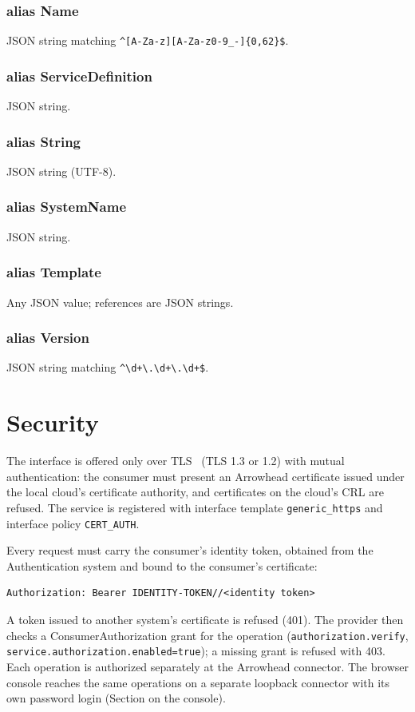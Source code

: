 \documentclass[a4paper]{arrowhead}
\newcommand{\pdef}[1]{{\textcolor{ArrowheadGrey}{#1\label{sec:model:primitives:#1}\label{sec:model:primitives:#1s}}}}
\begin{document}
\subsubsection*{alias \pdef{Name}}
JSON string matching \texttt{\^{}[A-Za-z][A-Za-z0-9\_-]\{0,62\}\$}.

\subsubsection*{alias \pdef{ServiceDefinition}}
JSON string.

\subsubsection*{alias \pdef{String}}
JSON string (UTF-8).

\subsubsection*{alias \pdef{SystemName}}
JSON string.

\subsubsection*{alias \pdef{Template}}
Any JSON value; references are JSON strings.

\subsubsection*{alias \pdef{Version}}
JSON string matching \texttt{\^{}\textbackslash{}d+\textbackslash{}.\textbackslash{}d+\textbackslash{}.\textbackslash{}d+\$}.



\section{Security}
\label{sec:security}
The interface is offered only over TLS~\cite{rfc8446} (TLS 1.3 or 1.2) with mutual authentication: the consumer must
present an Arrowhead certificate issued under the local cloud's certificate authority, and certificates on the
cloud's CRL are refused. The service is registered with interface template \texttt{generic\_\allowbreak{}https} and interface
policy \texttt{CERT\_AUTH}.

Every request must carry the consumer's identity token, obtained from the Authentication system and bound to the
consumer's certificate:
\begin{lstlisting}
Authorization: Bearer IDENTITY-TOKEN//<identity token>
\end{lstlisting}
A token issued to another system's certificate is refused (401). The provider then checks a ConsumerAuthorization
grant for the operation (\texttt{authorization.\allowbreak{}verify}, \texttt{service.\allowbreak{}authorization.\allowbreak{}enabled=\allowbreak{}true}); a missing grant is
refused with 403. Each operation is authorized separately at the Arrowhead connector. The browser console reaches the same operations on a separate loopback connector with its own password login (Section on the console).
\end{document}
